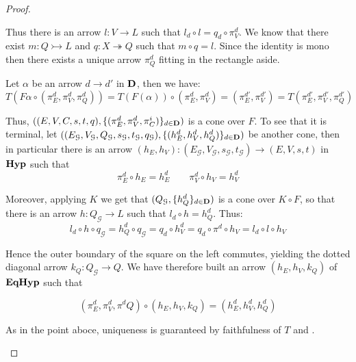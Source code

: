 \documentclass[a4paper,UKenglish,cleveref,pdftex,thm-restate,numberwithinsect]{lipics-v2021}
\def\D{\textbf {\textup{D}}}
\newcommand{\catname}[1]{\textbf{\textup{#1}}}
\newcommand{\hyp}{\catname{Hyp}}
\newcommand{\EqHyp}{\catname{EqHyp}} %
\newcommand{\mto}{\rightarrowtail}
\newcommand{\eto}{\twoheadrightarrow}
\newcommand{\id}[1]{\mathsf{id}_{#1}}
\begin{document}
\begin{proof}
\begin{enumerate}
\noindent 
\parbox{9.5cm}{Thus there is an arrow $l\colon V\to L$ such that $l_d\circ l=q_d\circ \pi^d_V$. We know that there exist $m\colon Q\mto L$ and $q\colon X\eto Q $ such that $m\circ q=l$. Since the identity is mono then there exists a unique arrow $\pi^d_Q$ fitting in the rectangle aside.} 	\hfill \parbox{3cm}{\xymatrix{
	V\ar[r]^{\pi_V^d}\ar@{>>}[d]_{q}&V_d\ar@{>>}[r]^{q_d}&Q_d\ar[d]^{\id{Q_d}}\\Q\ar@{>->}[r]_{m}\ar@{.>}[urr]_{\pi_Q^d}&L\ar[r]_{l_d}&{Q_d}
	}}
	
	Let $\alpha$ be an arrow $d\to d'$ in $\D$, then we have:
		\[T(F\alpha\circ (\pi^d_{E}, \pi^d_V, \pi^d_Q))=T(F(\alpha))\circ (\pi^d_E, \pi^d_V)=(\pi^{d'}_E, \pi^{d'}_V)=T(\pi^{d'}_{E}, \pi^{d'}_V, \pi^{d'}_Q)\]
	
	
	
	
		Thus, $((E, V, C, s, t, q), \{(\pi_E^d, \pi_V^d, \pi_C^i)\}_{d\in \D})$ is a cone over $F$. To see that it is terminal, let $((E_\mathcal{G},V_\mathcal{G}, Q_{\mathcal{G}}, s_{\mathcal{G}}, t_{\mathcal{G}}, q_{\mathcal{G}}), \{(h^d_E, h^d_V, h^d_Q)\}_{d\in \D})$ be another cone, then in particular there is an arrow $(h_E, h_V)\colon (E_\mathcal{G},V_\mathcal{G},  s_{\mathcal{G}}, t_{\mathcal{G}})\to (E, V, s, t)$ in $\hyp$ such that
		\[\pi^d_E\circ h_E=h^d_E \qquad \pi^d_V\circ h_V=h^d_V\]

		Moreover, applying $K$ we get that $(Q_{\mathcal{G}}, \{h^d_{Q}\}_{d\in \D})$ is a cone over $K\circ F$, so that there is an arrow $h\colon Q_{\mathcal{G}} \to L$ such that $l_d\circ h=h^d_{Q}$.  Thus:
		\[l_d\circ h\circ q_\mathcal{G}=h^d_Q\circ q_{\mathcal{G}}=q_{d}\circ h^d_V=q_d\circ \pi^d\circ h_V=l_d\circ l\circ h_V\]

\noindent 
\parbox{2cm}{}\hfill \parbox{9.5cm}{Hence the  outer boundary of the square on the left commutes, yielding the dotted diagonal arrow $k_Q\colon Q_\mathcal{G}\to Q$.  We have therefore built an arrow $(h_E, h_V, k_Q)$ of $\EqHyp$ such that}
\[(\pi^d_E, \pi^d_V, \pi^dQ)\circ (h_E, h_V, k_Q)=(h^d_E, h^d_V, h^d_Q)\] 

As in the point aboce, uniqueness is guaranteed by faithfulness of $T$ and .	\qedhere 
	\end{enumerate}
\end{proof}

\mn*
\end{document}
